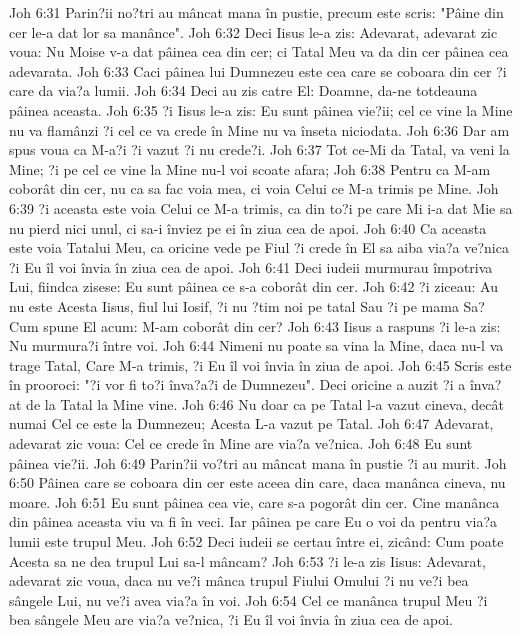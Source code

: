 Joh 6:31  Parin?ii no?tri au mâncat mana în pustie, precum este scris: "Pâine din cer le-a dat lor sa manânce".
Joh 6:32  Deci Iisus le-a zis: Adevarat, adevarat zic voua: Nu Moise v-a dat pâinea cea din cer; ci Tatal Meu va da din cer pâinea cea adevarata.
Joh 6:33  Caci pâinea lui Dumnezeu este cea care se coboara din cer ?i care da via?a lumii.
Joh 6:34  Deci au zis catre El: Doamne, da-ne totdeauna pâinea aceasta.
Joh 6:35  ?i Iisus le-a zis: Eu sunt pâinea vie?ii; cel ce vine la Mine nu va flamânzi ?i cel ce va crede în Mine nu va înseta niciodata.
Joh 6:36  Dar am spus voua ca M-a?i ?i vazut ?i nu crede?i.
Joh 6:37  Tot ce-Mi da Tatal, va veni la Mine; ?i pe cel ce vine la Mine nu-l voi scoate afara;
Joh 6:38  Pentru ca M-am coborât din cer, nu ca sa fac voia mea, ci voia Celui ce M-a trimis pe Mine.
Joh 6:39  ?i aceasta este voia Celui ce M-a trimis, ca din to?i pe care Mi i-a dat Mie sa nu pierd nici unul, ci sa-i înviez pe ei în ziua cea de apoi.
Joh 6:40  Ca aceasta este voia Tatalui Meu, ca oricine vede pe Fiul ?i crede în El sa aiba via?a ve?nica ?i Eu îl voi învia în ziua cea de apoi.
Joh 6:41  Deci iudeii murmurau împotriva Lui, fiindca zisese: Eu sunt pâinea ce s-a coborât din cer.
Joh 6:42  ?i ziceau: Au nu este Acesta Iisus, fiul lui Iosif, ?i nu ?tim noi pe tatal Sau ?i pe mama Sa? Cum spune El acum: M-am coborât din cer?
Joh 6:43  Iisus a raspuns ?i le-a zis: Nu murmura?i între voi.
Joh 6:44  Nimeni nu poate sa vina la Mine, daca nu-l va trage Tatal, Care M-a trimis, ?i Eu îl voi învia în ziua de apoi.
Joh 6:45  Scris este în prooroci: "?i vor fi to?i înva?a?i de Dumnezeu". Deci oricine a auzit ?i a înva?at de la Tatal la Mine vine.
Joh 6:46  Nu doar ca pe Tatal l-a vazut cineva, decât numai Cel ce este la Dumnezeu; Acesta L-a vazut pe Tatal.
Joh 6:47  Adevarat, adevarat zic voua: Cel ce crede în Mine are via?a ve?nica.
Joh 6:48  Eu sunt pâinea vie?ii.
Joh 6:49  Parin?ii vo?tri au mâncat mana în pustie ?i au murit.
Joh 6:50  Pâinea care se coboara din cer este aceea din care, daca manânca cineva, nu moare.
Joh 6:51  Eu sunt pâinea cea vie, care s-a pogorât din cer. Cine manânca din pâinea aceasta viu va fi în veci. Iar pâinea pe care Eu o voi da pentru via?a lumii este trupul Meu.
Joh 6:52  Deci iudeii se certau între ei, zicând: Cum poate Acesta sa ne dea trupul Lui sa-l mâncam?
Joh 6:53  ?i le-a zis Iisus: Adevarat, adevarat zic voua, daca nu ve?i mânca trupul Fiului Omului ?i nu ve?i bea sângele Lui, nu ve?i avea via?a în voi.
Joh 6:54  Cel ce manânca trupul Meu ?i bea sângele Meu are via?a ve?nica, ?i Eu îl voi învia în ziua cea de apoi.
